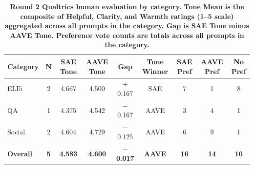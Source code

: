 \begin{table}[htbp]
\centering
\caption{\textbf{Round 2 Qualtrics human evaluation by category. Tone Mean is the composite of Helpful, Clarity, and Warmth ratings (1--5 scale) aggregated across all prompts in the category. Gap is SAE Tone minus AAVE Tone. Preference vote counts are totals across all prompts in the category.}}
\label{tab:round2-qualtrics-tone-by-category}
\renewcommand{\arraystretch}{1.4}
\begin{tabular}{|l|c|c|c|c|c|c|c|c|}
\hline
\textbf{Category} & \textbf{N} & \textbf{SAE Tone} & \textbf{AAVE Tone} & \textbf{Gap} & \textbf{Tone Winner} & \textbf{SAE Pref} & \textbf{AAVE Pref} & \textbf{No Pref} \\
\hline
ELI5   & 2 & 4.667 & 4.500 & $+$0.167 & SAE  & 7 & 1 & 8 \\
\hline
QA     & 1 & 4.375 & 4.542 & $-$0.167 & AAVE & 3 & 4 & 1 \\
\hline
Social & 2 & 4.604 & 4.729 & $-$0.125 & AAVE & 6 & 9 & 1 \\
\hline\hline
\textbf{Overall} & \textbf{5} & \textbf{4.583} & \textbf{4.600} & $-$\textbf{0.017} & \textbf{AAVE} & \textbf{16} & \textbf{14} & \textbf{10} \\
\hline
\end{tabular}
\end{table}
